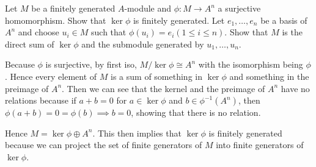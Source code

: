 \begin{questions}

	\question Let $M$ be a finitely generated $A$-module and $\phi :M\to A^n$ a surjective homomorphism. Show that $\ker \phi$ is finitely generated.
	\ifhint
		Let $e_{1}, \ldots , e_n$ be a basis of $A^n$ and choose $u_i \in M$ such that $\phi (u_i) = e_i (1\le i\le n)$. Show that $M$ is the direct sum of $\ker \phi$ and the submodule generated by $u_1, \ldots , u_n$.
	\fi
	\begin{solution}
		Because $\phi  $ is surjective, by first iso, $M / \ker \phi \cong A^n $ with the isomorphism being $\phi $.
		Hence every element of $M $ is a sum of something in $\ker \phi $ and something in the preimage of $A^n $.
		Then we can see that the kernel and the preimage of $A^n $ have no relations because if $a + b = 0 $ for $a\in \ker \phi $ and $b\in \phi ^{-1}(A^n) $, then $\phi (a+b) = 0 = \phi (b) \implies b = 0 $, showing that there is no relation.

		Hence $M = \ker \phi \oplus A^n $.
		This then implies that $\ker \phi$ is finitely generated because we can project the set of finite generators of $M $ into finite generators of $\ker \phi$.
	\end{solution}


\end{questions}

